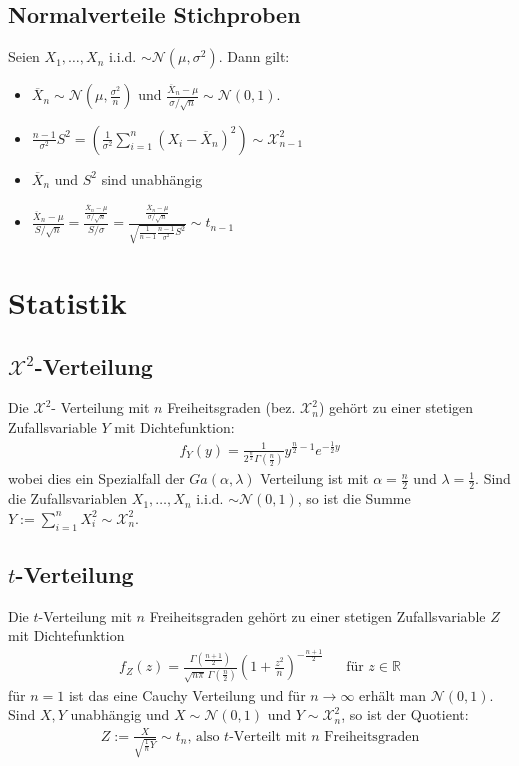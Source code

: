 \documentclass[8pt]{extarticle}
\newcommand{\R}{\mathbb{R}}
\newcommand{\X}{\mathcal{X}}
\newcommand{\ra}{\rightarrow}
\newcommand{\Sn}{\sum_{i = 1}^n}
\newcommand{\zufallsvariablen}{X_1, \dots, X_n}
\newcommand{\Normalverteilt}{\mathcal{N}  (\mu, \sigma^2)}
\newcommand{\Standardnormalverteilt}{\mathcal{N}  (0, 1)}
\begin{document}
\begin{multicols*}{3}
  \subsection*{Normalverteile Stichproben}
  Seien $\zufallsvariablen$ i.i.d. $\sim \Normalverteilt$. Dann gilt:
  \begin{itemize}
    \item $\overline{X}_n \sim \mathcal{N} (\mu, \frac{\sigma^2}{n})$
          und $\frac{\overline{X}_n - \mu}{\sigma / \sqrt{n}} \sim \Standardnormalverteilt$.
    \item $\frac{n-1}{\sigma^2} S^2 = \left( \frac{1}{\sigma^2} \Sn  (X_i - \overline{X}_n)^2 \right) \sim \mathcal{X}^2_{n-1}$
    \item $\overline{X}_n$ und $S^2$ sind unabhängig
    \item $\frac{\overline{X}_n - \mu}{S / \sqrt{n}} = \frac{ \frac{\overline{X}_n - \mu}{\sigma / \sqrt{n}} }{S / \sigma} = \frac{ \frac{\overline{X}_n - \mu}{\sigma / \sqrt{n}} }{\sqrt{\frac{1}{n-1} \frac{n-1}{\sigma^2} S^2}} \sim t_{n-1}$
  \end{itemize}
  
  \hypertarget{sec:4}{\section{Statistik}}
  \subsection*{$\X^2$-Verteilung}
  Die $\X^2$- Verteilung mit $n$ Freiheitsgraden  (bez. $\X^2_n$) gehört zu einer
  stetigen Zufallsvariable $Y$ mit Dichtefunktion:
  \begin{align*}
    f_Y (y) = \frac{1}{2^{\frac{n}{2}}  \Gamma (\frac{n}{2})} y^{\frac{n}{2} - 1} e^{-\frac{1}{2} y}
  \end{align*}
  wobei dies ein Spezialfall der $Ga (\alpha, \lambda)$ Verteilung ist mit
  $\alpha = \frac{n}{2}$ und $\lambda = \frac{1}{2}$. Sind die Zufallsvariablen
  $\zufallsvariablen$ i.i.d. $\sim \Standardnormalverteilt$, so ist die Summe
  $Y := \Sn X_i^2 \sim \X^2_n$.
  \subsection*{$t$-Verteilung}
  Die $t$-Verteilung mit $n$ Freiheitsgraden gehört zu einer stetigen
  Zufallsvariable $Z$ mit Dichtefunktion
  \begin{align*}
    f_Z (z) = \frac{\Gamma (\frac{n+1}{2})}{\sqrt{n \pi} \, \Gamma (\frac{n}{2})} \left( 1 + \frac{z^2}{n} \right)^{-\frac{n+1}{2}}
     &  & \text{für } z \in \R
  \end{align*}
  für $n = 1$ ist das eine Cauchy Verteilung und für $n \ra \infty$ erhält man
  $\Standardnormalverteilt$. Sind $X, Y$ unabhängig und $X \sim \Standardnormalverteilt$
  und $Y \sim \X^2_n$, so ist der Quotient:
  \begin{align*}
    Z := \frac{X}{\sqrt{\frac{1}{n} Y}} \sim t_n \text{, also $t$-Verteilt mit $n$ Freiheitsgraden}
  \end{align*}

\end{multicols*}
\end{document}
